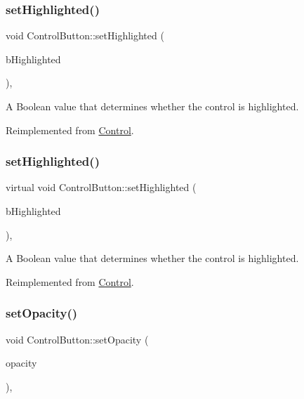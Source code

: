 \subsubsection{\texorpdfstring{set\+Highlighted()}{setHighlighted()}\hspace{0.1cm}{\footnotesize\ttfamily [1/2]}}
{\footnotesize\ttfamily void Control\+Button\+::set\+Highlighted (\begin{DoxyParamCaption}\item[{bool}]{b\+Highlighted }\end{DoxyParamCaption})\hspace{0.3cm}{\ttfamily [override]}, {\ttfamily [virtual]}}

A Boolean value that determines whether the control is highlighted. 

Reimplemented from \hyperlink{classControl_a8bde57862133c06d64178fb1a0c31e8b}{Control}.

\mbox{\label{classControlButton_a534815c8b3462f04f39cfd1c2ba98645}} 
\subsubsection{\texorpdfstring{set\+Highlighted()}{setHighlighted()}\hspace{0.1cm}{\footnotesize\ttfamily [2/2]}}
{\footnotesize\ttfamily virtual void Control\+Button\+::set\+Highlighted (\begin{DoxyParamCaption}\item[{bool}]{b\+Highlighted }\end{DoxyParamCaption})\hspace{0.3cm}{\ttfamily [override]}, {\ttfamily [virtual]}}

A Boolean value that determines whether the control is highlighted. 

Reimplemented from \hyperlink{classControl_a8bde57862133c06d64178fb1a0c31e8b}{Control}.

\mbox{\label{classControlButton_aa6076ef32569a9be5361f12bf00d4aa1}} 
\subsubsection{\texorpdfstring{set\+Opacity()}{setOpacity()}\hspace{0.1cm}{\footnotesize\ttfamily [1/2]}}
{\footnotesize\ttfamily void Control\+Button\+::set\+Opacity (\begin{DoxyParamCaption}\item[{G\+Lubyte}]{opacity }\end{DoxyParamCaption})\hspace{0.3cm}{\ttfamily [override]}, {\ttfamily [virtual]}}

